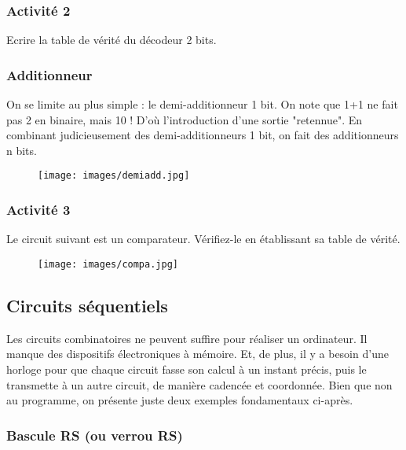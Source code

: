 \documentclass[11pt,a4paper,french,twoside]{PMCours}
\begin{document}
\subsubsection*{Activité 2}

Ecrire la table de vérité du décodeur 2 bits.

\subsubsection{Additionneur}

On se limite au plus simple : le demi-additionneur 1 bit. On note que 1+1 ne fait pas 2 en binaire, mais 10 ! D'où l'introduction d'une sortie "retennue". En combinant judicieusement des demi-additionneurs 1 bit, on fait des additionneurs n bits.

\begin{center}
\begin{figure}[ht]
\centering
\texttt{[image: images/demiadd.jpg]}
\end{figure}
\end{center}


\subsubsection*{Activité 3}

Le circuit suivant est un comparateur. Vérifiez-le en établissant sa table de vérité.
\begin{center}
\begin{figure}[ht]
\centering
\texttt{[image: images/compa.jpg]}
\end{figure}
\end{center}


\subsection{Circuits séquentiels}


Les circuits combinatoires ne peuvent suffire pour réaliser un ordinateur. Il manque des dispositifs électroniques à mémoire. Et, de plus, il y a besoin d'une horloge pour que chaque circuit fasse son calcul à un instant précis, puis le transmette à un autre circuit, de manière cadencée et coordonnée. Bien que non au programme, on présente juste deux exemples fondamentaux ci-après.


\subsubsection{Bascule RS (ou verrou RS)}
\end{document}
